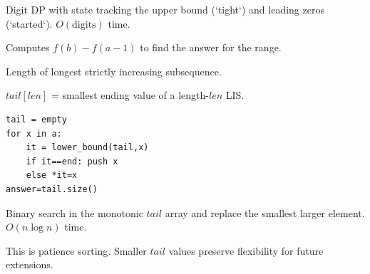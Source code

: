 \Solution Digit DP with state tracking the upper bound (`tight`) and leading zeros (`started`). $O(\text{digits})$ time.

\Analysis Computes $f(b) - f(a-1)$ to find the answer for the range.


\Problem Length of longest strictly increasing subsequence.

\State $tail[len]$ = smallest ending value of a length-$len$ LIS.
\begin{lstlisting}
tail = empty
for x in a:
    it = lower_bound(tail,x)
    if it==end: push x
    else *it=x
answer=tail.size()
\end{lstlisting}

\Solution Binary search in the monotonic $tail$ array and replace the smallest larger element. $O(n \log n)$ time.

\Analysis This is patience sorting. Smaller $tail$ values preserve flexibility for future extensions.
